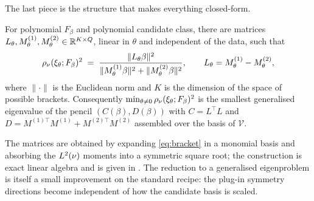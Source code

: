 The last piece is the structure that makes everything closed-form.

\begin{lemma}
\label{lem:bilinear}
For polynomial $F_\beta$ and polynomial candidate class, there are matrices
$L_\theta, M^{(1)}_\theta, M^{(2)}_\theta \in \mathbb{R}^{K\times Q}$, linear in
$\theta$ and independent of the data, such that
\begin{equation}
  \rho_\nu(\xi_\theta; F_\beta)^2
  \;=\; \frac{\|L_\theta \beta\|^2}
             {\|M^{(1)}_\theta \beta\|^2 + \|M^{(2)}_\theta \beta\|^2},
  \qquad L_\theta = M^{(1)}_\theta - M^{(2)}_\theta ,
  \label{eq:ratio}
\end{equation}
where $\|\cdot\|$ is the Euclidean norm and $K$ is the dimension of the space of
possible brackets. Consequently
$\min_{\theta \ne 0} \rho_\nu(\xi_\theta;F_\beta)^2$ is the smallest
generalised eigenvalue of the pencil $(C(\beta), D(\beta))$ with
$C = L^{\!\top}L$ and $D = M^{(1)\top}M^{(1)} + M^{(2)\top}M^{(2)}$ assembled
over the basis of $\mathcal V$.
\end{lemma}

The matrices are obtained by expanding \eqref{eq:bracket} in a monomial basis and
absorbing the $L^2(\nu)$ moments into a symmetric square root; the
construction is exact linear algebra and is given in .
The reduction to a generalised eigenproblem is itself a small improvement on
the standard recipe: the plug-in symmetry directions become independent of how
the candidate basis is scaled.
